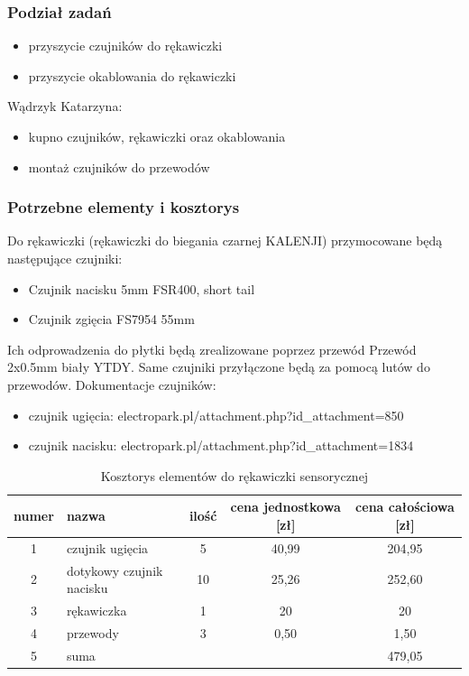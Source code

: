 \documentclass{article}
\begin{document}
\subsubsection{Podział zadań}
\begin{itemize}
    \item przyszycie czujników do rękawiczki
    \item przyszycie okablowania do rękawiczki
\end{itemize}
Wądrzyk Katarzyna:
\begin{itemize}
    \item kupno czujników, rękawiczki oraz okablowania
    \item montaż czujników do przewodów
\end{itemize}
\subsubsection{Potrzebne elementy i kosztorys}
Do rękawiczki (rękawiczki do biegania czarnej KALENJI) przymocowane będą następujące czujniki:
\begin{itemize}
    \item Czujnik nacisku 5mm FSR400, short tail
    \item Czujnik zgięcia FS7954 55mm
\end{itemize}
Ich odprowadzenia do płytki będą zrealizowane poprzez przewód Przewód 2x0.5mm biały YTDY.
Same czujniki przyłączone będą za pomocą lutów do przewodów.
Dokumentacje czujników:

\begin{itemize}
  \item czujnik ugięcia: electropark.pl/attachment.php?id\textit{\_}attachment=850
  \item czujnik nacisku: electropark.pl/attachment.php?id\textit{\_}attachment=1834

\end{itemize}

\begin{table}[ht!]
\centering
\caption{Kosztorys elementów do rękawiczki sensorycznej}
\begin{tabular}{|c|l|c|c|c|}
\hline
    numer & nazwa & ilość & cena jednostkowa [zł] & cena całościowa [zł] \\
 \hline
    1 & czujnik ugięcia & 5 & 40,99 & 204,95 \\
    2 & dotykowy czujnik nacisku & 10 & 25,26 & 252,60 \\
    3 & rękawiczka & 1 & 20 & 20 \\
    4 & przewody & 3 & 0,50 & 1,50 \\
    \hline
    5 & suma & & & 479,05\\
    \hline
\end{tabular}
\label{tab:rekawiczka}
\end{table}
\end{document}
